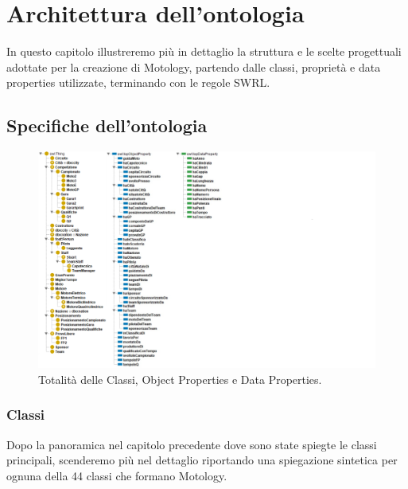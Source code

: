 \chapter{Architettura dell'ontologia}
In questo capitolo illustreremo più in dettaglio la struttura e le scelte progettuali adottate per la creazione di Motology, partendo dalle classi, proprietà e data properties utilizzate, terminando con le regole SWRL.

\section{Specifiche dell'ontologia}
\begin{figure}[H]
    \begin{center}
        \includegraphics[scale=0.83]{img/Gerarchie.png}
       \caption{Totalità delle Classi, Object Properties e Data Properties.} 
    \end{center}
\end{figure}

\subsection{Classi}
Dopo la panoramica nel capitolo precedente dove sono state spiegte le classi principali, scenderemo più nel dettaglio riportando una spiegazione sintetica per ognuna della 44 classi che formano Motology.

